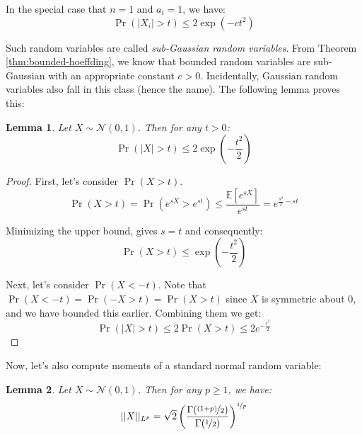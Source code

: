 \documentclass{article}
\newtheorem{lemma}{Lemma}[subsection]
\theoremstyle{remark}
\newcommand{\Exp}{\mathbb{E}}
\newcommand{\calN}{\mathcal{N}}
\begin{document}
In the special case that \(n=1\) and \(a_{i} = 1\), we have:
\begin{equation*}
\Pr\left(|X_{i}| > t\right) \leq 2\exp(-ct^{2})
\end{equation*}

Such random variables are called \emph{sub-Gaussian random variables}. From Theorem \ref{thm:bounded-hoeffding}, we know that bounded random variables are sub-Gaussian with an appropriate constant \(c > 0\). Incidentally, Gaussian random variables also fall in this class (hence the name). The following lemma proves this:
\begin{lemma}
Let \(X \sim \calN(0, 1)\). Then for any \(t > 0\):
\begin{equation*}
\Pr(|X| > t) \leq 2\exp\left(-\frac{t^{2}}{2}\right)
\end{equation*}
\end{lemma}

\begin{proof}
First, let's consider \(\Pr(X > t)\).
\begin{equation*}
\Pr(X > t) = \Pr\left(e^{sX} > e^{st}\right) \leq \frac{\Exp\left[e^{sX}\right]}{e^{st}} = e^{\frac{s^{2}}{2} - st}
\end{equation*}

Minimizing the upper bound, gives \(s = t\) and consequently:
\begin{equation*}
\Pr(X > t) \leq \exp\left(-\frac{t^{2}}{2}\right)
\end{equation*}

Next, let's consider \(\Pr(X < -t)\). Note that \(\Pr(X < -t) = \Pr(-X > t) = \Pr(X > t)\) since \(X\) is symmetric about \(0\), and we have bounded this earlier. Combining them we get:
\begin{equation*}
\Pr(|X| > t) \leq 2\Pr(X > t) \leq 2e^{-\frac{t^{2}}{2}}
\end{equation*}
\end{proof}

Now, let's also compute moments of a standard normal random variable:
\begin{lemma}
\label{lem:standard-normal-moments}
Let \(X \sim \calN(0, 1)\). Then for any \(p \geq 1\), we have:
\begin{equation*}
||X||_{L^{p}} = \sqrt{2}\left(\frac{\Gamma(\nicefrac{(1 + p)}{2})}{\Gamma(\nicefrac{1}{2})}\right)^{\nicefrac{1}{p}}
\end{equation*}
\end{lemma}
\end{document}
